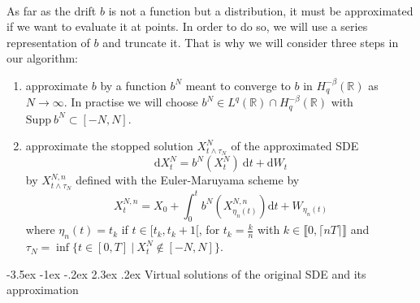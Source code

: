 \documentclass[11pt]{article}
\makeatletter
\renewcommand\section{\@startsection {section}{1}{\z@}%
    {-3.5ex \@plus -1ex \@minus -.2ex}%
    {2.3ex \@plus.2ex}%
    {\centering\large\scshape\bfseries}}
\newcommand{\R}{\mathbb{R}}
\newcommand{\di}{\mathrm{d}}
\makeatother
\begin{document}
\paragraph{}
As far as the drift $b$ is not a function but a distribution, it must be approximated if we want to evaluate it at points. In order to do so, we will use a series representation of $b$ and truncate it. That is why we will consider three steps in our algorithm:
\begin{enumerate}
    \item approximate $b$ by a function $b^N$ meant to converge to $b$ in $H^{-\beta}_q(\R)$ as $N\rightarrow\infty$. In practise we will choose $b^N\in L^q(\R)\cap H^{-\beta}_q(\R)$ with $\mathrm{Supp}\ b^N\subset[-N,N]$.
    \item approximate the stopped solution $X^N_{t\wedge\tau_N}$ of the approximated SDE
    \begin{equation} \label{sde2}
    \di X^N_t = b^N\left(X^N_t\right)\ \di t + \di W_t
    \end{equation} 
    by $X^{N,n}_{t\wedge\tau_N}$ defined with the Euler-Maruyama scheme by
    \begin{equation}\label{euler}
    X^{N,n}_t = X_0 + \int_0^t b^N\left(X^{N,n}_{\eta_n(t)}\right)\di t + W_{\eta_n(t)}
    \end{equation}
    where $\eta_n(t)=t_k$ if $t\in[t_k,t_k+1[$, for $t_k=\frac{k}{n}$ with $ k\in\llbracket0,\lceil nT\rceil\rrbracket$ 
    and $\tau_N = \inf\{t\in[0,T]\ |\ X^N_t\notin[-N,N]\}$.
    
\end{enumerate}

\section{Virtual solutions of the original SDE and its approximation}
\end{document}
